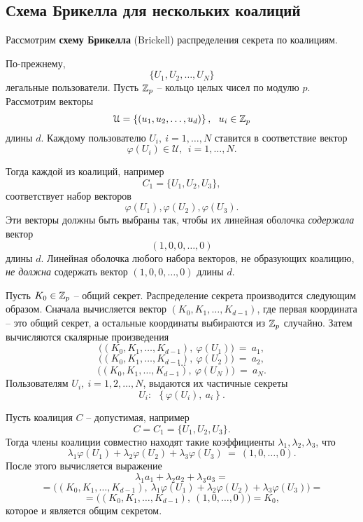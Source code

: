 \subsection{Схема Брикелла для нескольких коалиций}

Рассмотрим \textbf{схему Брикелла} (Brickell) распределения секрета по коалициям.

По-прежнему,
    \[ \{ U_1, U_2, \dots, U_N \} \]
легальные пользователи. Пусть $\mathbb{Z}_p$ -- кольцо целых чисел  по модулю $p$. Рассмотрим векторы
    \[ \mathcal{U} = \left\{ (u_1, u_2, \dots, u_d) \right\}, ~~ u_i \in \mathbb{Z}_p \]
длины $d$. Каждому пользователю $U_i, ~ i = 1, \dots, N$ ставится в соответствие вектор
    \[ \varphi(U_i) \in \mathcal{U}, ~~ i = 1, \dots, N. \]

Тогда каждой из коалиций, например
    \[ C_1 = \{ U_1, U_2, U_3 \}, \]
соответствует набор векторов
    \[ \varphi(U_1), \varphi(U_2), \varphi(U_3). \]
Эти векторы должны быть выбраны так, чтобы их линейная оболочка \emph{содержала} вектор
    \[ (1, 0, 0, \dots, 0) \]
длины $d$. Линейная оболочка  любого набора векторов, не образующих коалицию, \emph{не должна} содержать вектор $(1, 0, 0, \dots, 0)$ длины $d$.

Пусть $K_0 \in \mathbb{Z}_p$ -- общий секрет. Распределение секрета производится следующим образом. Сначала вычисляется вектор $(K_0, K_1, \dots, K_{d-1})$, где первая координата -- это общий секрет, а остальные координаты выбираются из $\mathbb{Z}_p$ случайно. Затем вычисляются скалярные произведения
\[
    \Big( \left( K_0, K_1, \dots, K_{d-1} \right), ~ \varphi(U_1) \Big) ~=~ a_1,
\] \[
    \Big( \left( K_0, K_1, \dots, K_{d-1} \right), ~ \varphi(U_2) \Big) ~=~ a_2,
\] \[
    \dots
\] \[
    \Big( \left( K_0, K_1, \dots, K_{d-1} \right), ~ \varphi(U_N) \Big) ~=~ a_N.
\]
Пользователям $U_i, ~ i = 1, 2, \dots, N$, выдаются их частичные секреты
    \[ U_i: ~~ \left\{ \varphi(U_i), ~ a_i \right\}. \]

Пусть коалиция $C$ -- допустимая, например
    \[ C = C_1 = \{ U_1, U_2, U_3 \}. \]
Тогда члены коалиции совместно находят  такие коэффициенты $\lambda_1, \lambda_2, \lambda_3$, что
    \[ \lambda_1\varphi(U_1)+\lambda_2\varphi(U_2)+\lambda_3\varphi(U_3) ~=~ (1,0, \dots, 0). \]
После этого вычисляется выражение
\[
    \lambda_1 a_1 + \lambda_2 a_2 + \lambda_3 a_3 =
\] \[
    = \Big( \left( K_0, K_1, \dots, K_{d-1} \right), ~ \lambda_1 \varphi(U_1) + \lambda_2 \varphi(U_2) + \lambda_3 \varphi(U_3) \Big) =
\] \[
    = \Big( \left( K_0, K_1, \dots, K_{d-1} \right), ~ \left( 1, 0, \dots, 0 \right) \Big) =  K_0,
\]
которое и является общим секретом.

